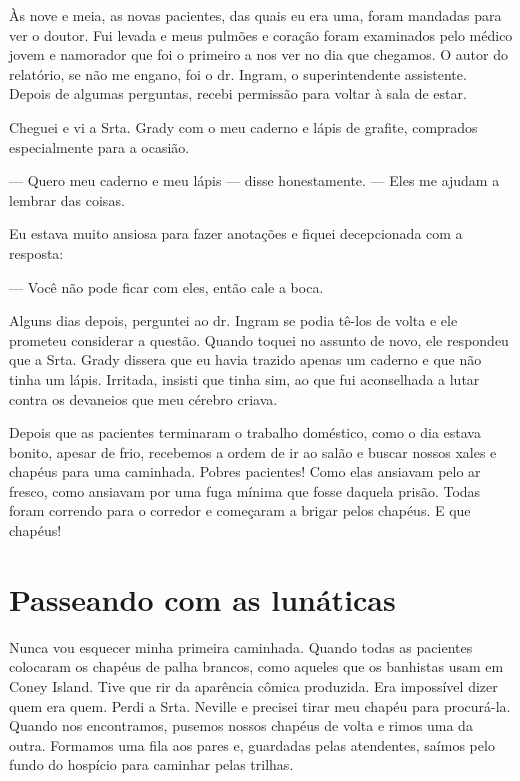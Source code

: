 Às nove e meia, as novas pacientes, das quais eu era uma, foram mandadas
para ver o doutor. Fui levada e meus pulmões e coração foram examinados
pelo médico jovem e namorador que foi o primeiro a nos ver no dia que
chegamos. O autor do relatório, se não me engano, foi o dr. Ingram, o
superintendente assistente. Depois de algumas perguntas, recebi
permissão para voltar à sala de estar.

Cheguei e vi a Srta. Grady com o meu caderno e lápis de grafite,
comprados especialmente para a ocasião.

--- Quero meu caderno e meu lápis --- disse honestamente. --- Eles me
ajudam a lembrar das coisas.

Eu estava muito ansiosa para fazer anotações e fiquei decepcionada com a
resposta:

--- Você não pode ficar com eles, então cale a boca.

Alguns dias depois, perguntei ao dr. Ingram se podia tê-los de volta e
ele prometeu considerar a questão. Quando toquei no assunto de novo, ele
respondeu que a Srta. Grady dissera que eu havia trazido apenas um
caderno e que não tinha um lápis. Irritada, insisti que tinha sim, ao
que fui aconselhada a lutar contra os devaneios que meu cérebro criava.

Depois que as pacientes terminaram o trabalho doméstico, como o dia
estava bonito, apesar de frio, recebemos a ordem de ir ao salão e buscar
nossos xales e chapéus para uma caminhada. Pobres pacientes! Como elas
ansiavam pelo ar fresco, como ansiavam por uma fuga mínima que fosse
daquela prisão. Todas foram correndo para o corredor e começaram a
brigar pelos chapéus. E que chapéus!


\label{section-6}

\chapter{Passeando com as
lunáticas}\label{capuxedtulo-xii-passeando-com-as-lunuxe1ticas}

Nunca vou esquecer minha primeira caminhada. Quando todas as pacientes
colocaram os chapéus de palha brancos, como aqueles que os banhistas
usam em Coney Island. Tive que rir da aparência cômica produzida. Era
impossível dizer quem era quem. Perdi a Srta. Neville e precisei tirar
meu chapéu para procurá-la. Quando nos encontramos, pusemos nossos
chapéus de volta e rimos uma da outra. Formamos uma fila aos pares e,
guardadas pelas atendentes, saímos pelo fundo do hospício para caminhar
pelas trilhas.

